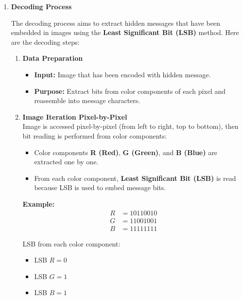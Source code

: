 \documentclass{ittelkom}
\begin{document}
\begin{enumerate}
    \item \textbf{Decoding Process}

          The decoding process aims to extract hidden messages that have been embedded in
          images using the \textbf{Least Significant Bit (LSB)} method. Here are the
          decoding steps:

          \begin{enumerate}
              \item \textbf{Data Preparation}
                    \begin{itemize}
                        \item \textbf{Input:} Image that has been encoded with hidden message.
                        \item \textbf{Purpose:} Extract bits from color components of each pixel and reassemble into message characters.
                    \end{itemize}

              \item \textbf{Image Iteration Pixel-by-Pixel} \\
                    Image is accessed pixel-by-pixel (from left to right, top to bottom), then bit reading is performed from color components:
                    \begin{itemize}
                        \item Color components \textbf{R (Red)}, \textbf{G (Green)}, and \textbf{B (Blue)}
                              are extracted one by one.
                        \item From each color component, \textbf{Least Significant Bit (LSB)} is read because
                              LSB is used to embed message bits.
                    \end{itemize}

                    \noindent
                    \textbf{Example:}
                    \[
                        \begin{array}{rl}
                            R & = 10110010 \\
                            G & = 11001001 \\
                            B & = 11111111
                        \end{array}
                    \]

                    \noindent
                    LSB from each color component:
                    \begin{itemize}
                        \item LSB $R = 0$
                        \item LSB $G = 1$
                        \item LSB $B = 1$
                    \end{itemize}


\end{enumerate}
\end{enumerate}
\end{document}

